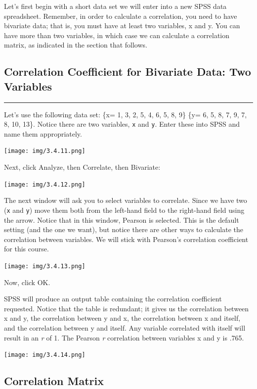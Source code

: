 \documentclass[]{book}
\begin{document}
Let's first begin with a short data set we will enter into a new SPSS
data spreadsheet. Remember, in order to calculate a correlation, you
need to have bivariate data; that is, you must have at least two
variables, x and y. You can have more than two variables, in which case
we can calculate a correlation matrix, as indicated in the section that
follows.

\subsection{Correlation Coefficient for Bivariate Data: Two
Variables}\label{correlation-coefficient-for-bivariate-data-two-variables}

\begin{center}\rule{0.5\linewidth}{0.5pt}\end{center}

Let's use the following data set: \{x= 1, 3, 2, 5, 4, 6, 5, 8, 9\} \{y=
6, 5, 8, 7, 9, 7, 8, 10, 13\}. Notice there are two variables,
\texttt{x} and \texttt{y}. Enter these into SPSS and name them
appropriately.

\texttt{[image: img/3.4.11.png]}

Next, click {Analyze}, then {Correlate}, then {Bivariate}:

\texttt{[image: img/3.4.12.png]}

The next window will ask you to select variables to correlate. Since we
have two (\texttt{x} and \texttt{y}) move them both from the left-hand
field to the right-hand field using the arrow. Notice that in this
window, {Pearson} is selected. This is the default setting (and the one
we want), but notice there are other ways to calculate the correlation
between variables. We will stick with Pearson's correlation coefficient
for this course.

\texttt{[image: img/3.4.13.png]}

Now, click {OK}.

SPSS will produce an output table containing the correlation coefficient
requested. Notice that the table is redundant; it gives us the
correlation between x and y, the correlation between y and x, the
correlation between x and itself, and the correlation between y and
itself. Any variable correlated with itself will result in an \emph{r}
of 1. The Pearson \emph{r} correlation between variables x and y is
.765.

\texttt{[image: img/3.4.14.png]}

\subsection{Correlation Matrix}\label{correlation-matrix}
\end{document}

